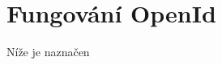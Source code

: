 \documentclass[11pt,twoside,a4paper]{book}
\begin{document}


%
{

}

\appendix
\chapter{Fungování OpenId}
Níže je naznačen 
\end{document}
